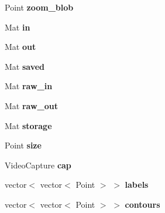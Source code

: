 \begin{DoxyCompactItemize}
\item 
\hypertarget{classcalibration_af15b11ca11726a106ce3581d28ae2fe2}{Point {\bfseries zoom\-\_\-blob}}\label{classcalibration_af15b11ca11726a106ce3581d28ae2fe2}

\item 
\hypertarget{classcalibration_a5381436b7a018d1bd969198a6ee84309}{Mat {\bfseries in}}\label{classcalibration_a5381436b7a018d1bd969198a6ee84309}

\item 
\hypertarget{classcalibration_a683520c2e997f8acf95d0c3cad6290b9}{Mat {\bfseries out}}\label{classcalibration_a683520c2e997f8acf95d0c3cad6290b9}

\item 
\hypertarget{classcalibration_a992ee8c844d808217befd60c10c02980}{Mat {\bfseries saved}}\label{classcalibration_a992ee8c844d808217befd60c10c02980}

\item 
\hypertarget{classcalibration_aa72b48a8e046d6409517e418335fb45b}{Mat {\bfseries raw\-\_\-in}}\label{classcalibration_aa72b48a8e046d6409517e418335fb45b}

\item 
\hypertarget{classcalibration_af12fa7781d0b718f408b6cae7a25704e}{Mat {\bfseries raw\-\_\-out}}\label{classcalibration_af12fa7781d0b718f408b6cae7a25704e}

\item 
\hypertarget{classcalibration_a6eab74dcffae5bd8449df9b79b2d8ebc}{Mat {\bfseries storage}}\label{classcalibration_a6eab74dcffae5bd8449df9b79b2d8ebc}

\item 
\hypertarget{classcalibration_a10327f11f7951f4282ada6c354e62522}{Point {\bfseries size}}\label{classcalibration_a10327f11f7951f4282ada6c354e62522}

\item 
\hypertarget{classcalibration_a4fbb8e4cac6239dc7135963c0f500105}{Video\-Capture {\bfseries cap}}\label{classcalibration_a4fbb8e4cac6239dc7135963c0f500105}

\item 
\hypertarget{classcalibration_ac1a1606070bf5b667f1e7a07e3e08d1d}{vector$<$ vector$<$ Point $>$ $>$ {\bfseries labels}}\label{classcalibration_ac1a1606070bf5b667f1e7a07e3e08d1d}

\item 
\hypertarget{classcalibration_a81c7edbfe89f8f1692193bc81309a55d}{vector$<$ vector$<$ Point $>$ $>$ {\bfseries contours}}\label{classcalibration_a81c7edbfe89f8f1692193bc81309a55d}


\end{DoxyCompactItemize}
